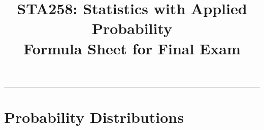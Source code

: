 \documentclass{article}
\newcommand{\HRule}{\rule{\linewidth}{0.25mm}}
\begin{document}

\date{}

\title{\vspace{-1.750cm} 
	\Large
	\textbf{
		STA258: Statistics with Applied Probability\\
    		Formula Sheet for Final Exam}
	}

\maketitle

\vspace{-1.75cm}
\HRule

\large


\vspace*{-0.50cm}
\section*{Probability Distributions}
\end{document}
